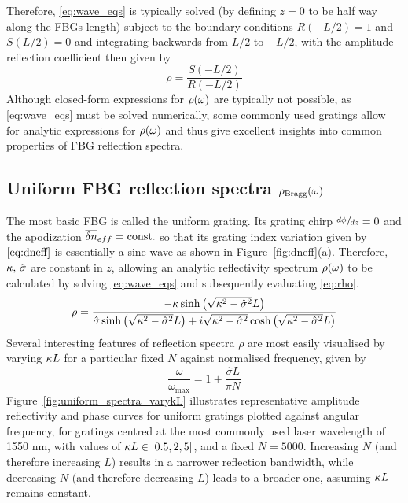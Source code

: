 Therefore, \eqref{eq:wave_eqs} is typically solved (by defining $z=0$ to be half way along the FBGs length) subject to the boundary conditions $R(-L/2)=1$ and $S(L/2)=0$ and integrating backwards from $L/2$ to $-L/2$, 
with the amplitude reflection coefficient then given by
%
\begin{equation}
\label{eq:rho}
    \rho = \frac{S(-L/2)}{R(-L/2)}
\end{equation}
%
Although closed-form expressions for $\rho(\omega)$ are typically not possible, as \eqref{eq:wave_eqs} must be solved numerically, 
some commonly used gratings allow for analytic expressions for $\rho(\omega)$ and thus give excellent insights into common properties of FBG reflection spectra.
%
%
\subsection{Uniform FBG reflection spectra $\rho_\text{Bragg}(\omega)$}
\label{subsec:FBG_feedback}
%
The most basic FBG is called the uniform grating. 
Its grating chirp $\sfrac{d\phi}{dz} = 0$ and the apodization $\overline{\delta n}_{eff}=\text{const.}$ so that its grating index variation given by $\eqref{eq:dneff}$ is essentially a sine wave as shown in Figure~\ref{fig:dneff}(a). 
Therefore, $\kappa, \, \hat{\sigma}$ are constant in $z$, allowing an analytic reflectivity spectrum $\rho(\omega)$ to be calculated by solving \eqref{eq:wave_eqs} and subsequently evaluating \eqref{eq:rho}.
%
\begin{equation}
\label{eq:uniform_rho}
    \rho = \frac{-\kappa \sinh\left(\sqrt{\kappa^2 - \hat{\sigma}^2}L\right)}{\hat{\sigma} \sinh\left(\sqrt{\kappa^2 - \hat{\sigma}^2}L\right) + i\sqrt{\kappa^2 - \hat{\sigma}^2} \cosh\left(\sqrt{\kappa^2 - \hat{\sigma}^2}L\right)}
\end{equation}
%
Several interesting features of reflection spectra $\rho$ are most easily visualised by varying $\kappa L$ for a particular fixed $N$ against normalised frequency, given by \cite{erdogan1997fiber}
%
\begin{equation*}
    \frac{\omega}{\omega_\text{max}} = 1 + \frac{\hat{\sigma} L}{\pi N}
\end{equation*}
%
Figure~\ref{fig:uniform_spectra_varykL} illustrates representative amplitude reflectivity and phase curves for uniform gratings plotted against angular frequency, 
for gratings centred at the most commonly used laser wavelength of 1550 nm, with values of $\kappa L \in [0.5, 2, 5]$, and a fixed $N = 5000$. 
Increasing $N$ (and therefore increasing $L$) results in a narrower reflection bandwidth, while decreasing $N$ (and therefore decreasing $L$) leads to a broader one, assuming $\kappa L$ remains constant. 
